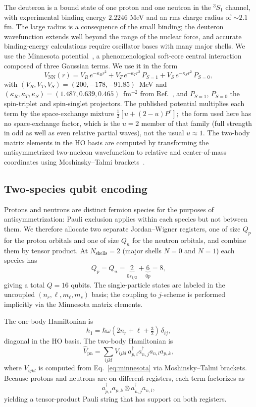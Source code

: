 \documentclass[twocolumn,prc,amsmath,amssymb,superscriptaddress]{revtex4-2}
\begin{document}
The deuteron is a bound state of one proton and one neutron in the
$^3S_1$ channel, with experimental binding energy $2.2246$ MeV and an
rms charge radius of $\sim 2.1$ fm. The large radius is a consequence
of the small binding; the deuteron wavefunction extends well beyond
the range of the nuclear force, and accurate binding-energy
calculations require oscillator bases with many major shells. We use
the Minnesota potential~\cite{Thompson1977}, a phenomenological
soft-core central interaction composed of three Gaussian terms. We use
it in the form
\begin{equation}
  V_{\mathrm{NN}}(r) = V_R\, e^{-\kappa_R r^2}
  + V_T\, e^{-\kappa_T r^2}\, P_{S=1}
  + V_S\, e^{-\kappa_S r^2}\, P_{S=0},
\label{eq:minnesota}
\end{equation}
with $(V_R, V_T, V_S) = (200, -178, -91.85)$~MeV and
$(\kappa_R, \kappa_T, \kappa_S) = (1.487, 0.639, 0.465)$~fm$^{-2}$
from Ref.~\cite{Thompson1977}, and $P_{S=1}$, $P_{S=0}$ the spin-triplet
and spin-singlet projectors. The published potential multiplies each
term by the space-exchange mixture $\tfrac12[u + (2-u)P^r]$;\ the form
used here has no space-exchange factor, which is the $u = 2$ member of
that family (full strength in odd as well as even relative partial
waves), not the usual $u \approx 1$. The two-body matrix elements in the
HO basis are computed by transforming the antisymmetrized
two-nucleon wavefunction to relative and center-of-mass coordinates
using Moshinsky--Talmi brackets~\cite{Moshinsky1959,Talmi1952}.

\subsection{Two-species qubit encoding}

Protons and neutrons are distinct fermion species for the purposes of
antisymmetrization: Pauli exclusion applies within each species but
not between them. We therefore allocate two separate Jordan--Wigner
registers, one of size $Q_p$ for the proton orbitals and one of size
$Q_n$ for the neutron orbitals, and combine them by tensor product.
At $N_{\mathrm{shells}} = 2$ (major shells $N=0$ and $N=1$) each
species has
\[
  Q_p = Q_n =
  \underbrace{2}_{0s_{1/2}} + \underbrace{6}_{0p} = 8,
\]
giving a total $Q = 16$ qubits. The single-particle states are labeled
in the uncoupled $(n_r, \ell, m_\ell, m_s)$ basis; the coupling to
$j$-scheme is performed implicitly via the Minnesota matrix elements.

The one-body Hamiltonian is
\[
  h_1 = \hbar\omega (2 n_r + \ell + \tfrac{3}{2}) \, \delta_{ij},
\]
diagonal in the HO basis. The two-body Hamiltonian is
\[
  \hat V_{\mathrm{pn}} = \sum_{ijkl} V_{ijkl}
  \, a^\dagger_{p,i} a^\dagger_{n,j} a_{n,l} a_{p,k},
\]
where $V_{ijkl}$ is computed from Eq.~\eqref{eq:minnesota} via
Moshinsky--Talmi brackets. Because protons and neutrons are on
different registers, each term factorizes as
\[
  a^\dagger_{p,i} a_{p,k} \otimes a^\dagger_{n,j} a_{n,l},
\]
yielding a tensor-product Pauli string that has support on both
registers.
\end{document}
